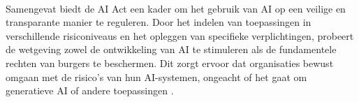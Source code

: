 \\[1em]
Samengevat biedt de AI Act een kader om het gebruik van AI op een veilige en transparante manier te reguleren. Door het indelen van toepassingen in verschillende risiconiveaus en het opleggen van specifieke verplichtingen, probeert de wetgeving zowel de ontwikkeling van AI te stimuleren als de fundamentele rechten van burgers te beschermen. Dit zorgt ervoor dat organisaties bewust omgaan met de risico’s van hun AI-systemen, ongeacht of het gaat om generatieve AI of andere toepassingen \autocite{EUAIAct2024}.